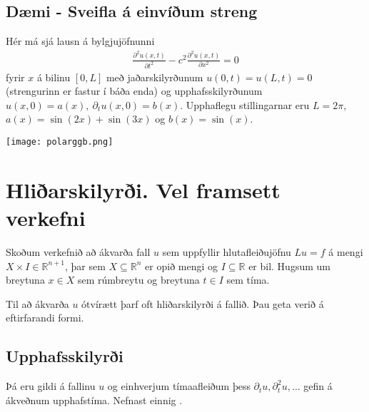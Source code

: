 \documentclass[a4paper,10pt,icelandic]{sphinxmanual}
\begin{document}
\subsection{Dæmi - Sveifla á einvíðum streng}
\label{\detokenize{Kafli01:daemi-sveifla-a-einvium-streng}}
Hér má sjá lausn á bylgjujöfnunni
\begin{equation*}
\begin{split}\frac{\partial^2 u(x,t)}{\partial t^2} - c^2  \frac{\partial^2 u(x,t)}{\partial x^2} = 0\end{split}
\end{equation*}
fyrir \(x\) á bilinu \([0,L]\) með jaðarskilyrðunum \(u(0,t) = u(L,t)=0\) (strengurinn er fastur í báða enda) og upphafsskilyrðunum \(u(x,0) = a(x),~\partial_t u(x,0) = b(x)\). Upphaflegu stillingarnar eru \(L=2\pi\), \(a(x) = \sin(2x)+\sin(3x)\) og \(b(x) = \sin(x)\).


\begin{center}
\texttt{[image: polarggb.png]}
\end{center}


\begin{DUlineblock}{0em}
\item[] 
\item[] 
\end{DUlineblock}


\section{Hliðarskilyrði. Vel framsett verkefni}
\label{\detokenize{Kafli01:hliarskilyri-vel-framsett-verkefni}}
Skoðum verkefnið að ákvarða fall \(u\) sem uppfyllir hlutafleiðujöfnu \(Lu = f\) á mengi \(X \times I \in \mathbb{R}^{n+1}\), þar sem \(X\subseteq \mathbb{R}^n\) er opið mengi og \(I \subseteq \mathbb{R}\) er bil. Hugsum um breytuna \(x\in X\) sem rúmbreytu og breytuna \(t\in I\) sem tíma.

Til að ákvarða \(u\)  ótvírætt þarf oft hliðarskilyrði á fallið. Þau geta verið á eftirfarandi formi.


\subsection{Upphafsskilyrði}
\label{\detokenize{Kafli01:upphafsskilyri}}
Þá eru gildi á fallinu \(u\) og einhverjum tímaafleiðum þess \(\partial_t u,\partial_t^2 u,\ldots\) gefin á ákveðnum upphafstíma. Nefnast einnig .
\end{document}
